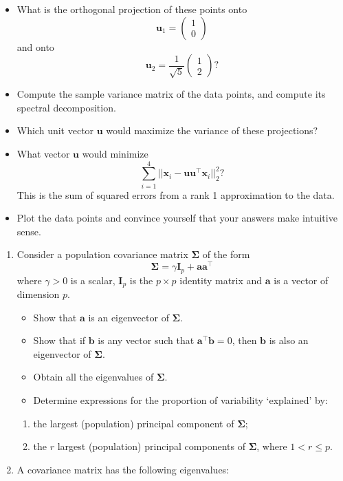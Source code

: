 \documentclass[]{book}
\providecommand{\tightlist}{%
  \setlength{\itemsep}{0pt}\setlength{\parskip}{0pt}}
\theoremstyle{definition}
\theoremstyle{definition}
\theoremstyle{definition}
\theoremstyle{remark}
\begin{document}
\begin{itemize}
\item
  What is the orthogonal projection of these points onto \[\mathbf u_1 = \begin{pmatrix}1\\0\end{pmatrix}\] and onto \[\mathbf u_2 =\frac{1}{\sqrt{5}}\begin{pmatrix}1\\2\end{pmatrix}?\]
\item
  Compute the sample variance matrix of the data points, and compute its spectral decomposition.
\item
  Which unit vector \(\mathbf u\) would maximize the variance of these projections?
\item
  What vector \(\mathbf u\) would minimize
  \[\sum_{i=1}^4 ||\mathbf x_i -\mathbf u\mathbf u^\top \mathbf x_i||^2_2?\]
  This is the sum of squared errors from a rank 1 approximation to the data.
\item
  Plot the data points and convince yourself that your answers make intuitive sense.
\end{itemize}

\begin{enumerate}
\def\labelenumi{\arabic{enumi}.}
\setcounter{enumi}{1}
\tightlist
\item
  Consider a population covariance matrix \(\boldsymbol{\Sigma}\) of the form
  \[\boldsymbol{\Sigma}=\gamma \mathbf I_p + \mathbf a\mathbf a^\top\]
  where \(\gamma>0\) is a scalar, \(\mathbf I_p\) is the \(p \times p\) identity matrix and \(\mathbf a\) is a vector of dimension \(p\).

  \begin{itemize}
  \tightlist
  \item
    Show that \(\mathbf a\) is an eigenvector of \(\boldsymbol{\Sigma}\).
  \item
    Show that if \(\mathbf b\) is any vector such that \(\mathbf a^\top \mathbf b=0\), then \(\mathbf b\) is also an eigenvector of \(\boldsymbol{\Sigma}\).
  \item
    Obtain all the eigenvalues of \(\boldsymbol{\Sigma}\).
  \item
    Determine expressions for the proportion of variability `explained' by:
  \end{itemize}

  \begin{enumerate}
  \def\labelenumii{\roman{enumii}.}
  \tightlist
  \item
    the largest (population) principal component of \(\boldsymbol{\Sigma}\);
  \item
    the \(r\) largest (population) principal components of \(\boldsymbol{\Sigma}\), where \(1 < r \leq p\).
  \end{enumerate}
\item
  A covariance matrix has the following eigenvalues:
\end{enumerate}
\end{document}
